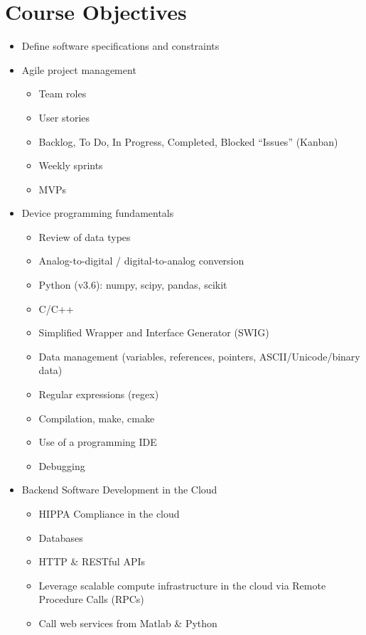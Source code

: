 \section*{Course Objectives}
\begin{multicols}{2}
\begin{itemize}
    \item Define software specifications and constraints
    \item Agile project management
    \begin{itemize}
        \item Team roles
        \item User stories
        \item Backlog, To Do, In Progress, Completed, Blocked ``Issues'' (Kanban)
        \item Weekly sprints
        \item MVPs
    \end{itemize}
    \item Device programming fundamentals
    \begin{itemize}
        \item Review of data types
        \item Analog-to-digital / digital-to-analog conversion
        \item Python (v3.6): numpy, scipy, pandas, scikit
        \item C/C++
        \item Simplified Wrapper and Interface Generator (SWIG)
        \item Data management (variables, references, pointers, ASCII/Unicode/binary data)
        \item Regular expressions (regex)
        \item Compilation, make, cmake
        \item Use of a programming IDE
        \item Debugging
    \end{itemize}
    \item Backend Software Development in the Cloud
    \begin{itemize}
        \item HIPPA Compliance in the cloud
        \item Databases
        \item HTTP \& RESTful APIs
        \item Leverage scalable compute infrastructure in the cloud via Remote Procedure Calls (RPCs)
        \item Call web services from Matlab \& Python

\end{itemize}
\end{itemize}
\end{multicols}
